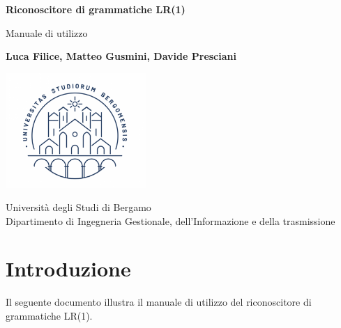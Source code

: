 \documentclass[12pt]{article}
\begin{document}
\begin{titlepage}
   \begin{center}
       \vspace*{4cm}
 
       \textbf{\Huge{Riconoscitore di grammatiche LR(1)}}
 
       \vspace{0.5cm}
        \large{Manuale di utilizzo}
 
       \vspace{2cm}
 
       \textbf{Luca Filice, Matteo Gusmini, Davide Presciani}
 
       \vfill
 
       \includegraphics[width=0.4\textwidth]{immagini/logo}
 
       Università degli Studi di Bergamo\\
       Dipartimento di Ingegneria Gestionale, dell'Informazione e della trasmissione\\
 
   \end{center}
\end{titlepage}
\tableofcontents

\pagebreak

\section{Introduzione}
Il seguente documento illustra il manuale di utilizzo del riconoscitore di grammatiche LR(1).
\end{document}

